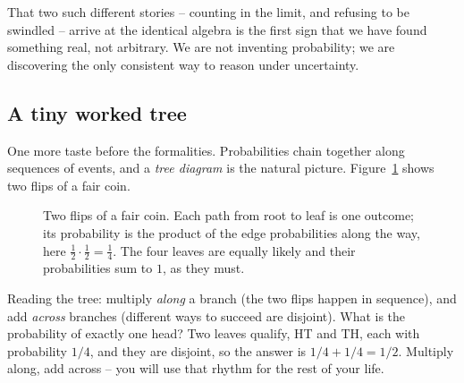 That two such different stories -- counting in the limit, and refusing to be
swindled -- arrive at the identical algebra is the first sign that we have found
something real, not arbitrary. We are not inventing probability; we are
discovering the only consistent way to reason under uncertainty.

\subsection{A tiny worked tree}
\label{ch01:tree}

One more taste before the formalities. Probabilities chain together along
sequences of events, and a \emph{tree diagram} is the natural picture.
Figure~\ref{ch01:fig-tree} shows two flips of a fair coin.

\begin{figure}[H]
\centering
{}
\caption{Two flips of a fair coin. Each path from root to leaf is one outcome; its
probability is the product of the edge probabilities along the way, here
$\frac12 \cdot \frac12 = \frac14$. The four leaves are equally likely and their
probabilities sum to $1$, as they must.}
\label{ch01:fig-tree}
\end{figure}

Reading the tree: multiply \emph{along} a branch (the two flips happen in
sequence), and add \emph{across} branches (different ways to succeed are disjoint).
What is the probability of exactly one head? Two leaves qualify, HT and TH, each
with probability $1/4$, and they are disjoint, so the answer is
$1/4 + 1/4 = 1/2$. Multiply along, add across -- you will use that rhythm for the
rest of your life.

